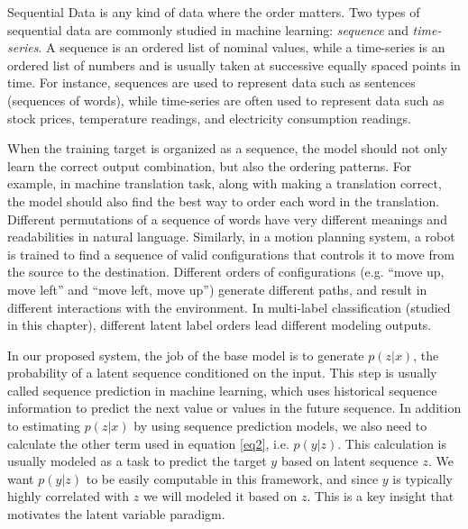 Sequential Data is any kind of data where the order matters. Two types of sequential data are commonly studied in machine learning: \textit{sequence} and \textit{time-series}. A sequence is an ordered list of nominal values, while a time-series is an ordered list of numbers and is usually taken at successive equally spaced points in time. For instance, sequences are used to represent data such as sentences (sequences of words), while time-series are often used to represent data such as stock prices, temperature readings, and electricity consumption readings. 

When the training target is organized as a sequence, the model should not only learn the correct output combination, but also the ordering patterns. For example, in machine translation task, along with making a translation correct, the model should also find the best way to order each word in the translation. Different permutations of a sequence of words have very different meanings and readabilities in natural language. Similarly, in a motion planning system, a robot is trained to find a sequence of valid configurations that controls it to move from the source to the destination. Different orders of configurations (e.g. ``move up, move left'' and ``move left, move up'') generate different paths, and result in different interactions with the environment. In multi-label classification (studied in this chapter), different latent label orders lead different modeling outputs.

In our proposed system, the job of the base model is to generate $p(z|x)$, the probability of a latent sequence conditioned on the input. This step is usually called sequence prediction in machine learning, which uses historical sequence information to predict the next value or values in the future sequence. In addition to estimating $p(z|x)$ by using sequence prediction models, we also need to calculate the other term used in equation \ref{eq2}, i.e. $p(y|z)$. This calculation is usually modeled as a task to predict the target $y$ based on latent sequence $z$. We want $p(y|z)$ to be easily computable in this framework, and since $y$ is typically highly correlated with $z$ we will modeled it based on $z$. This is a key insight that motivates the latent variable paradigm. 



